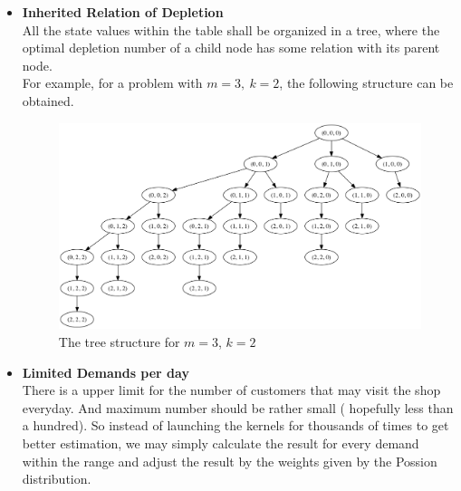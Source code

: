 \documentclass[11pt,reqno]{article}
\begin{document}
        \begin{itemize}
                \item \textbf{Inherited Relation of Depletion }\hfill \\ All the state values within the table shall be organized in a tree, where the  optimal depletion number of a child node has some relation with its parent node. \\
                        For example, for a problem with $ m = 3, ~ k = 2$, the following structure can be obtained.
                        \begin{figure}[ht]
                                \centering
                                \includegraphics[width = 160mm]{treeStruct.png}
                                \caption{ The tree structure for $m = 3$, $k = 2$}
                        \end{figure}
                \item \textbf{Limited Demands per day }\hfill \\ There is a upper limit for the number of customers that may visit the shop everyday. And maximum number should be rather small ( hopefully less than a hundred).  So instead of launching the kernels for thousands of times to get better estimation, we may simply calculate the result for every demand within the range and adjust the result by the weights given by the Possion distribution. 
        \end{itemize}
        
\end{document}
